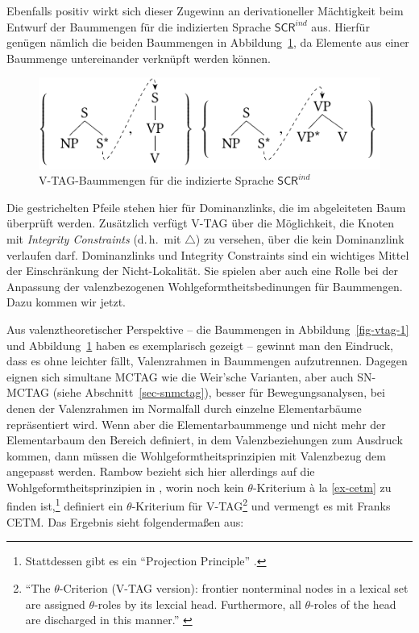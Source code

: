 Ebenfalls positiv wirkt sich dieser Zugewinn an derivationeller Mächtigkeit beim Entwurf der Baummengen für die indizierten Sprache $\mathsf{SCR}^{ind}$ aus. Hierfür genügen nämlich die beiden Baummengen in Abbildung~\ref{fig-vtag-2}, da Elemente aus einer Baummenge untereinander verknüpft werden können.  
\begin{figure}[t]
\centering
\includegraphics{graphics/abb67.pdf}
\caption{V-TAG-Baummengen für die indizierte Sprache $\mathsf{SCR}^{ind}$\label{fig-vtag-2}}
\end{figure}
Die gestrichelten Pfeile stehen hier für Dominanzlinks, die im abgeleiteten Baum überprüft werden. Zusätzlich verfügt V-TAG über die Möglichkeit, die Knoten mit {\it Integrity Constraints} (d.\,h.\ mit $\bigtriangleup$) zu versehen, über die kein Dominanzlink verlaufen darf. Dominanzlinks und Integrity Constraints sind ein wichtiges Mittel der Einschränkung der Nicht-Lokalität. Sie spielen aber auch eine Rolle bei der Anpassung der valenzbezogenen Wohlgeformtheitsbedinungen für Baummengen. Dazu kommen wir jetzt. 

Aus valenztheoretischer Perspektive -- die Baummengen in Abbildung~\ref{fig-vtag-1} und Abbildung~\ref{fig-vtag-2} haben es exemplarisch gezeigt -- gewinnt man den Eindruck, dass es ohne  leichter fällt, Valenzrahmen in Baummengen aufzutrennen. Dagegen eignen sich simultane MCTAG wie die Weir'sche Varianten, aber auch SN-MCTAG (siehe Abschnitt~\ref{sec-snmctag}), besser für Bewegungsanalysen, bei denen der Valenzrahmen im Normalfall durch einzelne Elementarbäume repräsentiert wird. Wenn aber die Elementarbaummenge und nicht mehr der Elementarbaum den Bereich definiert, in dem Valenzbeziehungen zum Ausdruck kommen, dann müssen die Wohlgeformtheitsprinzipien mit Valenzbezug dem angepasst werden. Rambow bezieht sich hier allerdings auf die Wohlgeformtheitsprinzipien in \cite{Frank:92}, worin noch kein $\theta$-Kriterium \`a la \ref{ex-cetm} zu finden ist,\footnote{Stattdessen gibt es ein "`Projection Principle"' \citep[56]{Frank:92}.} definiert ein $\theta$-Kriterium für V-TAG\footnote{"`The $\theta$-Criterion (V-TAG version): frontier nonterminal nodes in a lexical set are assigned $\theta$-roles by its lexcial head. Furthermore, all $\theta$-roles of the head are discharged in this manner."' \citep[148]{Rambow:94}} und vermengt es mit Franks CETM. Das Ergebnis sieht folgenderma\ss en aus:
    

